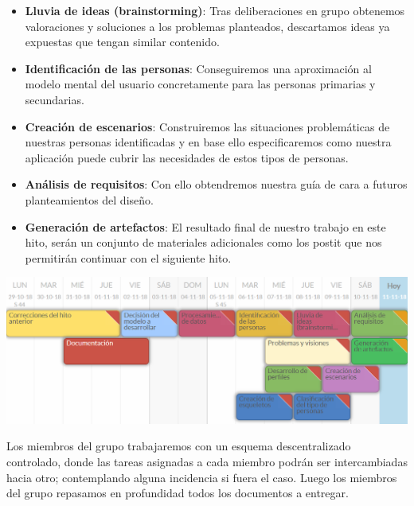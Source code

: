 \documentclass[12pt]{article}
\begin{document}
\begin{itemize}
\item \textbf{Lluvia de ideas (brainstorming)}: Tras deliberaciones en grupo obtenemos valoraciones y soluciones a los problemas planteados, descartamos ideas ya expuestas que tengan similar contenido. 


\item \textbf{Identificación de las personas}: Conseguiremos una aproximación al modelo mental del usuario concretamente para las personas primarias y secundarias.


\item \textbf{Creación de escenarios}​: Construiremos las situaciones problemáticas de nuestras personas identificadas y en base ello especificaremos como nuestra aplicación puede cubrir las necesidades de estos tipos de personas.

\item \textbf{Análisis de requisitos}​: Con ello obtendremos nuestra guía de cara a futuros planteamientos del diseño. 


\item \textbf{Generación de artefactos}​: El resultado final de nuestro trabajo en este hito, serán un conjunto
de materiales adicionales como los postit que nos permitirán continuar con el siguiente hito. 

\end{itemize}


\begin{center}
	\includegraphics[width=1\textwidth]{planificacionHito2.png}
\end{center}
\phantom{10}

Los miembros del grupo trabajaremos con un esquema descentralizado controlado, donde las tareas asignadas a cada miembro podrán ser intercambiadas hacia otro; contemplando alguna incidencia si fuera el caso. Luego los miembros del grupo repasamos en profundidad todos los documentos a entregar.
\end{document}
